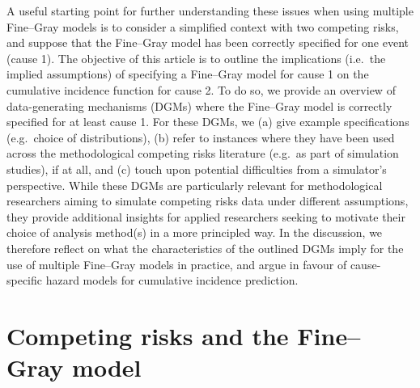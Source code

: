 \documentclass[
  letterpaper,
  DIV=11,
  numbers=noendperiod]{scrreprt}
\begin{document}
A useful starting point for further understanding these issues when
using multiple Fine--Gray models is to consider a simplified context
with two competing risks, and suppose that the Fine--Gray model has been
correctly specified for one event (cause 1). The objective of this
article is to outline the implications (i.e.~the implied assumptions) of
specifying a Fine--Gray model for cause 1 on the cumulative incidence
function for cause 2. To do so, we provide an overview of
data-generating mechanisms (DGMs) where the Fine--Gray model is
correctly specified for at least cause 1. For these DGMs, we (a) give
example specifications (e.g.~choice of distributions), (b) refer to
instances where they have been used across the methodological competing
risks literature (e.g.~as part of simulation studies), if at all, and
(c) touch upon potential difficulties from a simulator's perspective.
While these DGMs are particularly relevant for methodological
researchers aiming to simulate competing risks data under different
assumptions, they provide additional insights for applied researchers
seeking to motivate their choice of analysis method(s) in a more
principled way. In the discussion, we therefore reflect on what the
characteristics of the outlined DGMs imply for the use of multiple
Fine--Gray models in practice, and argue in favour of cause-specific
hazard models for cumulative incidence prediction.

\hypertarget{competing-risks-and-the-finegray-model}{%
\section{Competing risks and the Fine--Gray
model}\label{competing-risks-and-the-finegray-model}}
\end{document}
